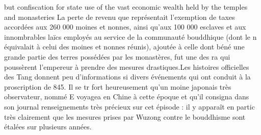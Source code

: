 but confiscation for state use of the vast economic wealth held by
the temples and monasteries
La perte de revenu que représentait l'exemption de taxes accordées aux 260 000 moines et nonnes, ainsi qu'aux 100 000 esclaves et aux innombrables laïcs employés au service de la communauté bouddhique (dont le n équivalait à celui des moines et nonnes réunis), ajoutée à celle dont béné une grande partie des terres possédées par les monastères, fut une des ra qui poussèrent l'empereur à prendre des mesures drastiques.Les histoires officielles des Tang donnent peu d'informations si divers événements qui ont conduit à la proscription de 845. Il se tr fort heureusement qu'un moine japonais très observateur, nommé E voyagea en Chine à cette époque et qu'il consigna dans son journal renseignements très précieux sur cet épisode : il y apparaît en partic très clairement que les mesures prises par Wuzong contre le bouddhisme sont étalées sur plusieurs années.
